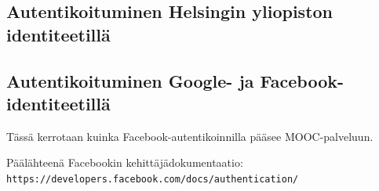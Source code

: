 \documentclass[finnish,gradu]{tktltiki}
\begin{document}
  \subsection{Autentikoituminen Helsingin yliopiston identiteetillä} %
  \label{sub:autentikoituminen_helsingin_yliopiston_käyttäjärekisteriin}




  \subsection{Autentikoituminen Google- ja Facebook-identiteetillä} %
  \label{sub:autentikoituminen_facebook}
  Tässä kerrotaan kuinka Facebook-autentikoinnilla pääsee MOOC-palveluun.

  Päälähteenä Facebookin kehittäjädokumentaatio:
  \\ \verb!https://developers.facebook.com/docs/authentication/!


\end{document}

